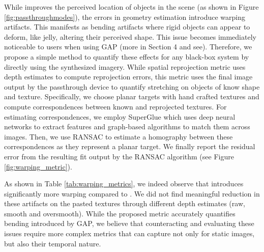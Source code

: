 While \GAP improves the perceived location of objects in the scene (as shown in Figure \ref{fig:passthroughmodes}), the errors in geometry estimation introduce warping artifacts. This manifests as bending artifacts where rigid objects can appear to deform, like jelly, altering their perceived shape. This issue becomes immediately noticeable to users when using GAP (more in Section 4 and see). Therefore, we propose a simple method to quantify these effects for any black-box system by directly using the synthesized imagery. While spatial reprojection metric uses depth estimates to compute reprojection errors, this metric uses the final image output by the passthrough device to quantify stretching on objects of know shape and texture. Specifically, we choose planar targets with hand crafted textures and compute correspondences between known and reprojected textures. For estimating correspondences, we employ SuperGlue \cite{sarlin20superglue} which uses deep neural networks to extract features and graph-based algorithms to match them across images. Then, we use RANSAC to estimate a homography between these correspondences as they represent a planar target.  We finally report the residual error from the resulting fit output by the RANSAC algorithm (see Figure \ref{fig:warping_metric}).




As shown in Table \ref{tab:warping_metrics}, we indeed observe that \GAP introduces significantly more warping compared to \DP. We did not find meaningful reduction in these artifacts on the pasted textures through different depth estimates (raw, smooth and oversmooth). While the proposed metric accurately quantifies bending introduced by GAP, we believe that counteracting and evaluating these issues require  more complex metrics that can capture not only for static images, but also their temporal nature.

